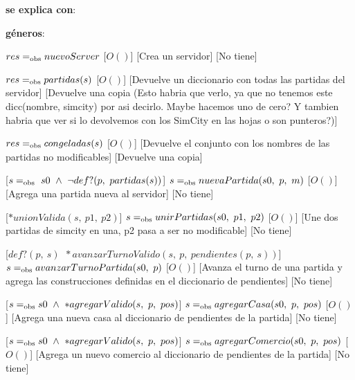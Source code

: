 \begin{Interfaz}
    \textbf{se explica con}: 

    \textbf{géneros}: 


    {$res =_{\mathrm{obs}} nuevoServer$}
    [$O()$]
    [Crea un servidor]
    [No tiene]

    {$res =_{\mathrm{obs}} partidas(s)$}
    [$O()$]
    [Devuelve un diccionario con todas las partidas del servidor]
    [Devuelve una copia (Esto habria que verlo, ya que no tenemos este dicc(nombre, simcity) por asi decirlo.
    Maybe hacemos uno de cero? Y tambien habria que ver si lo devolvemos con los SimCity en las hojas o son punteros?)]

    {$res =_{\mathrm{obs}} congeladas(s)$}
    [$O()$]
    [Devuelve el conjunto con los nombres de las partidas no modificables]
    [Devuelve una copia]

    [$s \igobs\ s0\ \wedge\ \lnot def?(p,\ partidas(s))$]
    {$s =_{\mathrm{obs}} nuevaPartida(s0,\ p,\ m)$}
    [$O()$]
    [Agrega una partida nueva al servidor]
    [No tiene]

    [$*unionValida(s,\ p1,\ p2)$]
    {$s \igobs unirPartidas(s0,\ p1,\ p2)$}
    [$O()$]
    [Une dos partidas de simcity en una, p2 pasa a ser no modificable]
    [No tiene]

    [$def?(p,\ s)\ $\yluego$\ *avanzarTurnoValido(s,\ p,\ pendientes(p,\ s))$]
    {$s \igobs avanzarTurnoPartida(s0,\ p)$}
    [$O()$]
    [Avanza el turno de una partida y agrega las construcciones definidas en el diccionario de pendientes]
    [No tiene]

    [$s \igobs s0\ \wedge\ *agregarValido(s,\ p,\ pos)$]
    {$s =_{\mathrm{obs}} agregarCasa(s0,\ p,\ pos)$}
    [$O()$]
    [Agrega una nueva casa al diccionario de pendientes de la partida]
    [No tiene]

    \pagebreak
    
    [$s \igobs s0\ \wedge\ *agregarValido(s,\ p,\ pos)$]
    {$s =_{\mathrm{obs}} agregarComercio(s0,\ p,\ pos)$}
    [$O()$]
    [Agrega un nuevo comercio al diccionario de pendientes de la partida]
    [No tiene]
    

\end{Interfaz}
